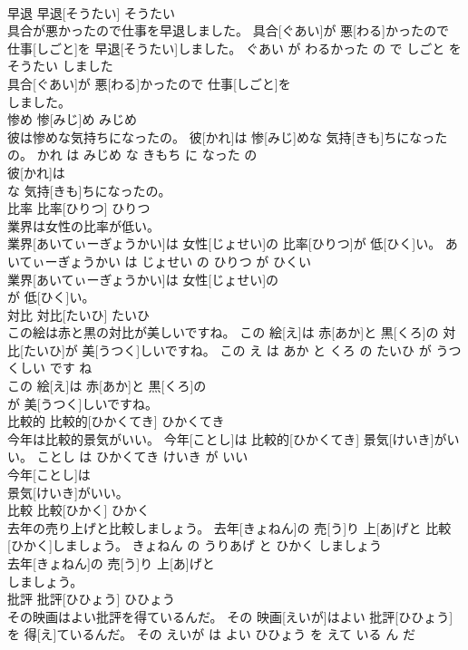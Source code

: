 \documentclass[8pt]{extreport}
\begin{document}
\begin{CJK}{UTF8}{min}
\\	早退	早退[そうたい]	そうたい	
\\	具合が悪かったので仕事を早退しました。	具合[ぐあい]が 悪[わる]かったので 仕事[しごと]を 早退[そうたい]しました。	ぐあい が わるかった の で しごと を そうたい しました	
\\	具合[ぐあい]が 悪[わる]かったので 仕事[しごと]を
\\	しました。			
\\	惨め	惨[みじ]め	みじめ	
\\	彼は惨めな気持ちになったの。	彼[かれ]は 惨[みじ]めな 気持[きも]ちになったの。	かれ は みじめ な きもち に なった の	
\\	彼[かれ]は
\\	な 気持[きも]ちになったの。			
\\	比率	比率[ひりつ]	ひりつ	
\\	業界は女性の比率が低い。	
\\	業界[あいてぃーぎょうかい]は 女性[じょせい]の 比率[ひりつ]が 低[ひく]い。	あいてぃーぎょうかい は じょせい の ひりつ が ひくい	
\\	業界[あいてぃーぎょうかい]は 女性[じょせい]の
\\	が 低[ひく]い。			
\\	対比	対比[たいひ]	たいひ	
\\	この絵は赤と黒の対比が美しいですね。	この 絵[え]は 赤[あか]と 黒[くろ]の 対比[たいひ]が 美[うつく]しいですね。	この え は あか と くろ の たいひ が うつくしい です ね	
\\	この 絵[え]は 赤[あか]と 黒[くろ]の
\\	が 美[うつく]しいですね。			
\\	比較的	比較的[ひかくてき]	ひかくてき	
\\	今年は比較的景気がいい。	今年[ことし]は 比較的[ひかくてき] 景気[けいき]がいい。	ことし は ひかくてき けいき が いい	
\\	今年[ことし]は
\\	景気[けいき]がいい。			
\\	比較	比較[ひかく]	ひかく	
\\	去年の売り上げと比較しましょう。	去年[きょねん]の 売[う]り 上[あ]げと 比較[ひかく]しましょう。	きょねん の うりあげ と ひかく しましょう	
\\	去年[きょねん]の 売[う]り 上[あ]げと
\\	しましょう。			
\\	批評	批評[ひひょう]	ひひょう	
\\	その映画はよい批評を得ているんだ。	その 映画[えいが]はよい 批評[ひひょう]を 得[え]ているんだ。	その えいが は よい ひひょう を えて いる ん だ	

\end{CJK}
\end{document}

